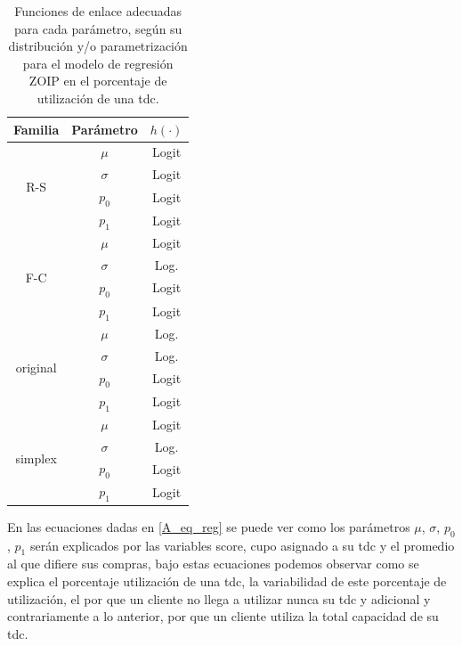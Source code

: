 \begin{table}[!hbt]
{\scriptsize
\begin{center}
\begin{tabular}{|c|c|c|}\hline
Familia & Par\'{a}metro & $h(\cdot)$ \\ \hline
\multirow{4}{*}{R-S} & $\mu$ & Logit \\
 & $\sigma$ & Logit \\
 & $p_0$ & Logit \\
 & $p_1$ & Logit \\ \hline

\multirow{4}{*}{F-C} & $\mu$ & Logit \\
 & $\sigma$ & Log. \\
 & $p_0$ & Logit \\
 & $p_1$ & Logit \\ \hline

\multirow{4}{*}{original} & $\mu$ & Log. \\
 & $\sigma$ & Log. \\
 & $p_0$ & Logit \\
 & $p_1$ & Logit \\ \hline

\multirow{4}{*}{simplex} & $\mu$ & Logit \\
 & $\sigma$ & Log. \\
 & $p_0$ & Logit \\
 & $p_1$ & Logit \\ \hline

\end{tabular}
\caption{Funciones de enlace adecuadas para cada par\'{a}metro, seg\'{u}n su distribuci\'{o}n y/o parametrizaci\'{o}n para el modelo de regresi\'{o}n ZOIP en el porcentaje de utilizaci\'{o}n de una tdc.}
\label{T_F_enlace2}
\end{center}
}
\end{table}

En las ecuaciones dadas en \eqref{A_eq_reg} se puede ver como los par\'{a}metros $\mu$, $\sigma$, $p_0$, $p_1$  ser\'{a}n explicados por las variables score, cupo asignado a su tdc y el promedio al que difiere sus compras, bajo estas ecuaciones podemos observar como se explica el porcentaje utilizaci\'{o}n de una tdc, la variabilidad de este porcentaje de utilizaci\'{o}n, el por que un cliente no llega a utilizar nunca su tdc y adicional y contrariamente a lo anterior, por que un cliente utiliza la total capacidad de su tdc.\\

